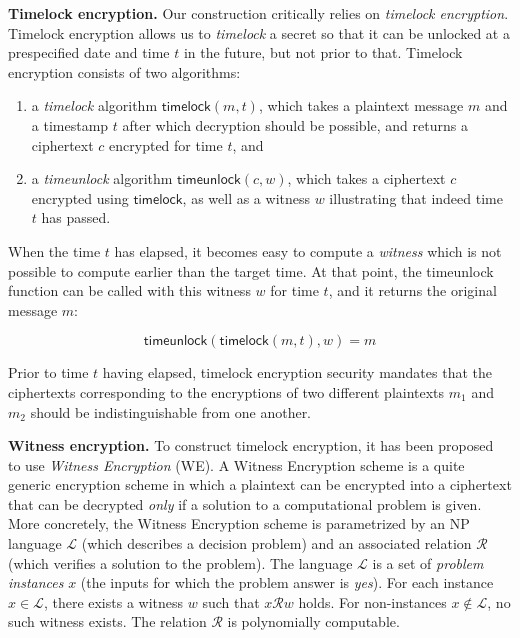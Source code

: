 \noindent
\textbf{Timelock encryption.}
Our construction critically relies on \emph{timelock encryption}.
Timelock encryption allows us to \emph{timelock} a secret so that it can be
unlocked at a prespecified date and time $t$ in the future, but not prior to
that. Timelock encryption consists of two algorithms:

\begin{enumerate}
  \item a \emph{timelock}
        algorithm $\textsf{timelock}(m, t)$, which takes a plaintext message $m$ and a
        timestamp $t$ after which decryption should be possible, and returns a ciphertext $c$
        encrypted for time $t$, and
  \item a \emph{timeunlock} algorithm $\textsf{timeunlock}(c, w)$, which takes a
        ciphertext $c$ encrypted using $\textsf{timelock}$, as well as a witness $w$
        illustrating that indeed time $t$ has passed.
\end{enumerate}

When the time $t$ has elapsed, it becomes easy to compute a \emph{witness} which is
not possible to compute earlier than the target time. At that point, the
\textsf{timeunlock} function can be called with this witness $w$ for time $t$, and it
returns the original message $m$:

\[
  \textsf{timeunlock}(\textsf{timelock}(m, t), w) = m
\]

Prior to time $t$ having elapsed, timelock encryption security mandates that the
ciphertexts corresponding to the encryptions of two different plaintexts $m_1$
and $m_2$ should be indistinguishable from one another.

\noindent
\textbf{Witness encryption.}
To construct timelock encryption, it has been proposed~\cite{timelock-bitcoin} to
use \emph{Witness Encryption} (WE). A Witness Encryption scheme is a quite generic
encryption scheme in which a plaintext can be encrypted into a ciphertext that
can be decrypted \emph{only} if a solution to a computational problem is given.
More concretely, the Witness Encryption scheme is parametrized by
an \textsc{NP} language $\mathcal{L}$ (which describes a decision problem)
and an associated relation $\mathcal{R}$ (which verifies a solution to the problem).
The language $\mathcal{L}$ is a set of \emph{problem instances} $x$ (the inputs
for which the problem answer is \emph{yes}). For each instance
$x \in \mathcal{L}$, there exists a witness $w$ such that $x\mathcal{R}w$ holds. For
non-instances $x \not\in \mathcal{L}$, no such witness exists. The relation $\mathcal{R}$
is polynomially computable.

